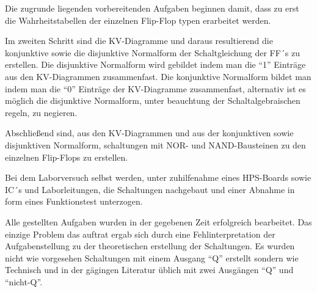Die zugrunde liegenden vorbereitenden Aufgaben beginnen damit, dass zu erst die Wahrheitstabellen
der einzelnen Flip-Flop typen erarbeitet werden. \par
Im zweiten Schritt sind die KV-Diagramme und daraus resultierend die konjunktive sowie die disjunktive 
Normalform der Schaltgleichung der FF´s zu erstellen.
Die disjunktive Normalform wird gebildet indem man die ``1'' Einträge aus den KV-Diagrammen zusammenfast.
Die konjunktive Normalform bildet man indem man die ``0'' Einträge der KV-Diagramme zusammenfast, 
alternativ ist es möglich die disjunktive Normalform, unter beauchtung der Schaltalgebraischen regeln, zu negieren.\par
Abschließend sind, aus den KV-Diagrammen und aus der konjunktiven sowie disjunktiven Normalform, schaltungen mit NOR- 
und NAND-Bausteinen zu den einzelnen Flip-Flops zu erstellen.\par
Bei dem Laborversuch selbst werden, unter zuhilfenahme eines HPS-Boards sowie IC´s und Laborleitungen, die Schaltungen nachgebaut und einer Abnahme in form eines Funktionstest unterzogen.\par
Alle gestellten Aufgaben wurden in der gegebenen Zeit erfolgreich bearbeitet.
Das einzige Problem das auftrat ergab sich durch eine Fehlinterpretation der Aufgabenstellung zu der theoretischen 
erstellung der Schaltungen. 
Es wurden nicht wie vorgesehen Schaltungen mit einem Ausgang ``Q'' erstellt sondern wie 
Technisch und in der gägingen Literatur üblich mit zwei Ausgängen ``Q'' und ``nicht-Q''.